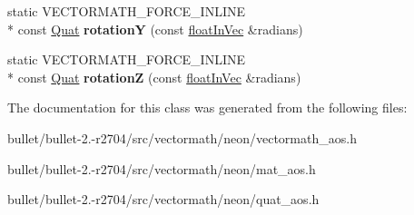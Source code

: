 \begin{DoxyCompactItemize}
\item 
\hypertarget{class_vectormath_1_1_aos_1_1_quat_a3e9474f58a664ed3cdc3b21008d7343d}{static V\+E\+C\+T\+O\+R\+M\+A\+T\+H\+\_\+\+F\+O\+R\+C\+E\+\_\+\+I\+N\+L\+I\+N\+E \\*
const \hyperlink{class_vectormath_1_1_aos_1_1_quat}{Quat} {\bfseries rotation\+Y} (const \hyperlink{class_vectormath_1_1float_in_vec}{float\+In\+Vec} \&radians)}\label{class_vectormath_1_1_aos_1_1_quat_a3e9474f58a664ed3cdc3b21008d7343d}

\item 
\hypertarget{class_vectormath_1_1_aos_1_1_quat_a98e09f63c0c30535933928203b67e307}{static V\+E\+C\+T\+O\+R\+M\+A\+T\+H\+\_\+\+F\+O\+R\+C\+E\+\_\+\+I\+N\+L\+I\+N\+E \\*
const \hyperlink{class_vectormath_1_1_aos_1_1_quat}{Quat} {\bfseries rotation\+Z} (const \hyperlink{class_vectormath_1_1float_in_vec}{float\+In\+Vec} \&radians)}\label{class_vectormath_1_1_aos_1_1_quat_a98e09f63c0c30535933928203b67e307}

\end{DoxyCompactItemize}


The documentation for this class was generated from the following files\+:\begin{DoxyCompactItemize}
\item 
bullet/bullet-\/2.-\/r2704/src/vectormath/neon/vectormath\+\_\+aos.\+h\item 
bullet/bullet-\/2.-\/r2704/src/vectormath/neon/mat\+\_\+aos.\+h\item 
bullet/bullet-\/2.-\/r2704/src/vectormath/neon/quat\+\_\+aos.\+h\end{DoxyCompactItemize}
